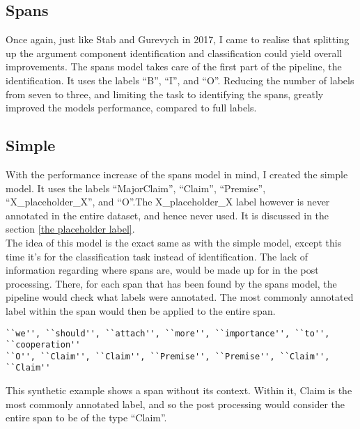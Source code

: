 \documentclass[12]{article}
\theoremstyle{mytheoremstyle}
\theoremstyle{mytheoremstyle}
\theoremstyle{myproblemstyle}
\begin{document}
  \subsection{Spans} \label{spans}
  Once again, just like Stab and Gurevych in 2017, I came to realise that splitting up the argument component identification and classification could yield overall improvements. The spans model takes care of the first part of the pipeline, the identification. It uses the labels ``B'', ``I'', and ``O''. Reducing the number of labels from seven to three, and limiting the task to identifying the spans, greatly improved the models performance, compared to full labels.
  \subsection{Simple} \label{simple}
  With the performance increase of the spans model in mind, I created the simple model. It uses the labels ``MajorClaim'', ``Claim'', ``Premise'', ``X\_placeholder\_X'', and ``O''.The X\_placeholder\_X label however is never annotated in the entire dataset, and hence never used. It is discussed in the section \ref{the placeholder label}.\\
 The idea of this model is the exact same as with the simple model, except this time it's for the classification task instead of identification. The lack of information regarding where spans are, would be made up for in the post processing. There, for each span that has been found by the spans model, the pipeline would check what labels were annotated. The most commonly annotated label within the span would then be applied to the entire span.  
  \begin{verbatim}
``we'', ``should'', ``attach'', ``more'', ``importance'', ``to'', ``cooperation''
``O'', ``Claim'', ``Claim'', ``Premise'', ``Premise'', ``Claim'', ``Claim''
  \end{verbatim}
  This synthetic example shows a span without its context. Within it, Claim is the most commonly annotated label, and so the post processing would consider the entire span to be of the type ``Claim''.
\end{document}
